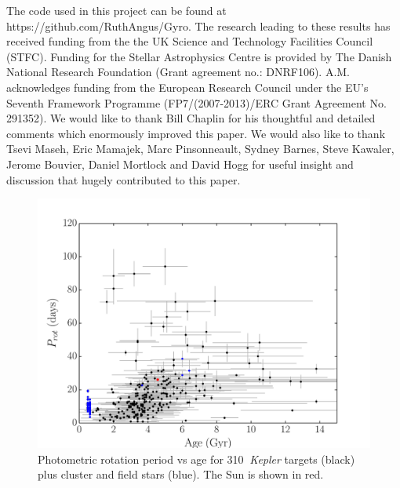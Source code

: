 \documentclass[11pt,preprint]{aastex}
\newcommand{\nastero}{310}
\begin{document}
The code used in this project can be found at
https://github.com/RuthAngus/Gyro.
The research leading to these results has received funding from the the UK
Science and Technology Facilities Council (STFC).
Funding for the Stellar Astrophysics Centre is provided by The Danish National
Research Foundation (Grant agreement no.: DNRF106).
A.M. acknowledges funding from the European Research Council under the EU’s
Seventh Framework Programme (FP7/(2007-2013)/ERC Grant Agreement No. 291352).
We would like to thank Bill Chaplin for his thoughtful and detailed comments
which enormously improved this paper.
We would also like to thank Tsevi Maseh, Eric Mamajek, Marc Pinsonneault,
Sydney Barnes, Steve Kawaler, Jerome Bouvier, Daniel Mortlock and David Hogg
for useful insight and discussion that hugely contributed to this paper.




\begin{figure}[ht]
\begin{center}
\includegraphics[width=6in, clip=true, trim=0 0 0.5in 0]{p_vs_a_paper2.pdf}
\caption{Photometric rotation period vs age for \nastero$~$ {\it Kepler}
	targets (black) plus cluster and field stars (blue). The Sun is shown
	in red.
\label{fig:p_vs_a}}
\end{center}
\end{figure}
\end{document}
